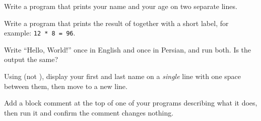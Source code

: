 \exercise Write a program that prints your name and your age on two separate
lines.

\exercise Write a program that prints the result of  together with a
short label, for example: \texttt{12 * 8 = 96}.

\exercise Write ``Hello, World!'' once in English and once in Persian, and run
both. Is the output the same?

\exercise Using  (not ), display your first and last
name on a \emph{single} line with one space between them, then move to a new
line.

\exercise Add a block comment at the top of one of your programs describing what
it does, then run it and confirm the comment changes nothing.
